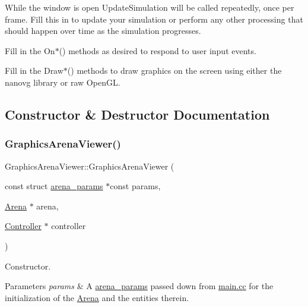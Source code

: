While the window is open Update\+Simulation will be called repeatedly, once per frame. Fill this in to update your simulation or perform any other processing that should happen over time as the simulation progresses.

Fill in the {\ttfamily On$\ast$()} methods as desired to respond to user input events.

Fill in the {\ttfamily Draw$\ast$()} methods to draw graphics on the screen using either the {\ttfamily nanovg} library or raw {\ttfamily Open\+GL}. 

\subsection{Constructor \& Destructor Documentation}
\mbox{\label{class_graphics_arena_viewer_a869510833897508300da65b1eb0c5d09}} 
\subsubsection{\texorpdfstring{Graphics\+Arena\+Viewer()}{GraphicsArenaViewer()}}
{\footnotesize\ttfamily Graphics\+Arena\+Viewer\+::\+Graphics\+Arena\+Viewer (\begin{DoxyParamCaption}\item[{const struct \mbox{\hyperlink{structarena__params}{arena\+\_\+params}} $\ast$const}]{params,  }\item[{\mbox{\hyperlink{class_arena}{Arena}} $\ast$}]{arena,  }\item[{\mbox{\hyperlink{class_controller}{Controller}} $\ast$}]{controller }\end{DoxyParamCaption})\hspace{0.3cm}{\ttfamily [explicit]}}



Constructor. 


\begin{DoxyParams}{Parameters}
{\em params} & A \mbox{\hyperlink{structarena__params}{arena\+\_\+params}} passed down from \mbox{\hyperlink{main_8cc}{main.\+cc}} for the initialization of the \mbox{\hyperlink{class_arena}{Arena}} and the entities therein. \\
\hline
\end{DoxyParams}
\mbox{\label{class_graphics_arena_viewer_a88cea02aab1550a7f315fbf4f3868109}} 
